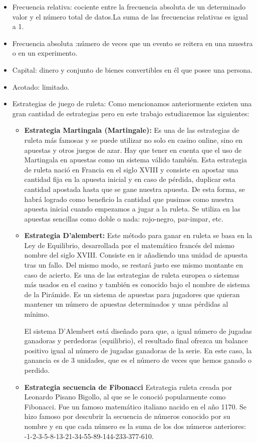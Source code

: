 \documentclass{article}
\begin{document}
 \begin{itemize}
    \item Frecuencia relativa: cociente entre la frecuencia absoluta de un determinado valor y el número total de datos.La suma de las frecuencias relativas es igual a 1.
    \item  Frecuencia absoluta :número de veces que un evento se reitera en una muestra o en un experimento.
    \item Capital: dinero y conjunto de bienes convertibles en él que posee una persona.
    \item  Acotado: limitado.
    \item  Estrategias de juego de ruleta: Como mencionamos anteriormente existen una gran cantidad de estrategias pero en este trabajo estudiaremos las siguientes:
    \begin{itemize}
      \item \textbf{Estrategia Martingala (Martingale): } Es una de las estrategias de ruleta más famosas y se puede utilizar no solo en casino online, sino en apuestas y otros juegos de azar. Hay que tener en cuenta que el uso de Martingala en apuestas como un sistema válido también. Esta estrategia de ruleta nació en Francia en el siglo XVIII y consiste en apostar una cantidad fija en la apuesta inicial y en caso de pérdida, duplicar esta cantidad apostada hasta que se gane nuestra apuesta.
De esta forma, se habrá logrado como beneficio la cantidad que pusimos como nuestra apuesta inicial cuando empezamos a jugar a la ruleta. Se utiliza en las apuestas sencillas como doble o nada: rojo-negro, par-impar, etc.

\item \textbf{Estrategia D’alembert: }
Este método para ganar en ruleta se basa en la Ley de Equilibrio, desarrollada por el matemático francés del mismo nombre del siglo XVIII. Consiste en ir añadiendo una unidad de apuesta tras un fallo. Del mismo modo, se restará justo ese mismo montante en caso de acierto. Es una de las estrategias de ruleta europea o sistemas más usados en el casino y también es conocido bajo el nombre de sistema de la Pirámide. Es un sistema de apuestas para jugadores que quieran mantener un número de apuestas determinados y unas pérdidas al mínimo.
 
El sistema D’Alembert está diseñado para que, a igual número de jugadas ganadoras y perdedoras (equilibrio), el resultado final ofrezca un balance positivo igual al número de jugadas ganadoras de la serie. En este caso, la ganancia es de 3 unidades, que es el número de veces que hemos ganado o perdido.
\item \textbf{Estrategia secuencia de  Fibonacci}
Estrategia ruleta creada por Leonardo Pisano Bigollo, al que se le conoció popularmente como Fibonacci. Fue un famoso matemático italiano nacido en el año 1170. Se hizo famoso por descubrir la secuencia de números conocido por su nombre y en que cada número es la suma de los dos números anteriores: -1-2-3-5-8-13-21-34-55-89-144-233-377-610.
\end{itemize}
\end{itemize}
\end{document}
